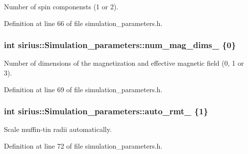 Number of spin componensts (1 or 2). 



Definition at line 66 of file simulation\+\_\+parameters.\+h.

\hypertarget{classsirius_1_1_simulation__parameters_a8ee49df1c0e77bdfa71ff9abaaef761b}{}
\subsubsection[{num\+\_\+mag\+\_\+dims\+\_\+}]{\setlength{\rightskip}{0pt plus 5cm}int sirius\+::\+Simulation\+\_\+parameters\+::num\+\_\+mag\+\_\+dims\+\_\+ \{0\}\hspace{0.3cm}{\ttfamily [protected]}}\label{classsirius_1_1_simulation__parameters_a8ee49df1c0e77bdfa71ff9abaaef761b}


Number of dimensions of the magnetization and effective magnetic field (0, 1 or 3). 



Definition at line 69 of file simulation\+\_\+parameters.\+h.

\hypertarget{classsirius_1_1_simulation__parameters_a745081d2fe55d458abe99fe476a0f117}{}
\subsubsection[{auto\+\_\+rmt\+\_\+}]{\setlength{\rightskip}{0pt plus 5cm}int sirius\+::\+Simulation\+\_\+parameters\+::auto\+\_\+rmt\+\_\+ \{1\}\hspace{0.3cm}{\ttfamily [protected]}}\label{classsirius_1_1_simulation__parameters_a745081d2fe55d458abe99fe476a0f117}


Scale muffin-\/tin radii automatically. 



Definition at line 72 of file simulation\+\_\+parameters.\+h.

\hypertarget{classsirius_1_1_simulation__parameters_a0ec6fb89078a406364190b00ebf0455a}{}
